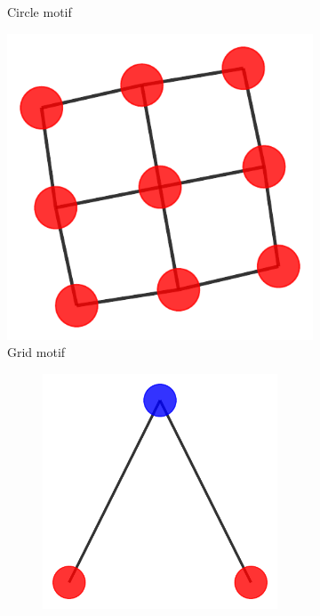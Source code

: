 \begin{figure}[h]
\begin{subfigure}[b]{0.2\textwidth}
        \caption{Circle motif}
        \label{fig:subfig2}
    \end{subfigure}
    \begin{subfigure}[b]{0.2\textwidth}
        \includegraphics[width=\linewidth]{img/Motif_Vis/Tree-Grid-MOTIF.pdf}
        \caption{Grid motif}
        \label{fig:subfig3}
    \end{subfigure}
    \begin{subfigure}[b]{0.30\textwidth}
        \centering
        \begin{subfigure}[b]{0.48\linewidth}
            \includegraphics[width=\linewidth]{img/Motif_Vis/MUTAG-MOTIF1.pdf}

\end{subfigure}
\end{subfigure}
\end{figure}
